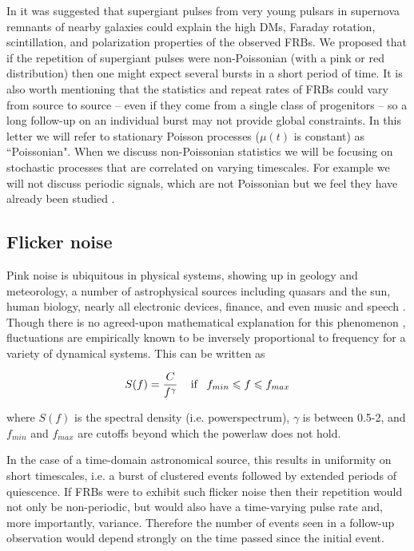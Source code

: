 \documentclass[useAMS,usenatbib]{mn2e}
\begin{document}
In \citep{2015arXiv150505535C} it was 
suggested that supergiant pulses from very young pulsars in supernova 
remnants of nearby galaxies could explain the high DMs, Faraday rotation, 
scintillation, and polarization properties of the observed FRBs. We  
proposed that if the repetition of supergiant pulses were non-Poissonian 
(with a pink or red distribution) 
then one might expect several bursts in a short period of time. 
It is also worth mentioning that the statistics and repeat rates of FRBs 
could vary from source to source -- even if 
they come from a single class of progenitors -- so a long follow-up on an individual burst 
may not provide global constraints.
In this 
letter we will refer to stationary Poisson processes ($\mu(t)$ is constant)
as ``Poissonian". When we discuss non-Poissonian statistics we will be
focusing on stochastic processes that are correlated on varying timescales. For
example we will not discuss periodic signals, which are not Poissonian but 
we feel they have already been studied \citep{2015MNRAS.454..457P}.


\subsection{Flicker noise}

Pink noise is ubiquitous in physical systems, showing up in 
geology and meteorology, a number 
of astrophysical sources including quasars and the sun, 
human biology, nearly all electronic devices, finance, 
and even music and speech
\citep{1978ComAp...7..103P, 1975Natur.258..317V}.
Though there is no agreed-upon
mathematical explanation for this phenomenon
 \citep{2002physics...4033M}, fluctuations 
are empirically known to be inversely proportional to frequency 
for a variety of dynamical systems. This can be written as 

\begin{equation}
S(f) = \frac{C}{f^\gamma} \,\,\,\,\,\ \textup{if} \,\,\,\,\, f_{min} \le f \le f_{max}
\end{equation}

\noindent where $S(f)$ is the spectral density (i.e. powerspectrum), $\gamma$ is 
between 0.5-2,
and $f_{min}$ and $f_{max}$ are cutoffs beyond which the powerlaw 
does not hold.

In the case of a time-domain astronomical 
source, this results in uniformity on short timescales, i.e. a burst of 
clustered events followed by extended periods of quiescence. 
If FRBs were to exhibit such flicker noise then their repetition would 
not only be non-periodic, but would also have a time-varying 
pulse rate and, more importantly, variance. Therefore the number of events
seen in a follow-up observation would depend strongly on 
the time passed since the initial event.
\end{document}
